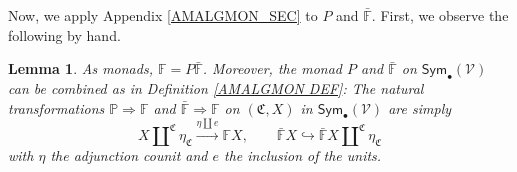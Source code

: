\documentclass[a4paper,10pt
,draft
]{article}%
\numberwithin{equation}{section}
\numberwithin{figure}{section}
\newtheorem{lemma}[equation]{Lemma}%
\theoremstyle{definition} %
\newcommand{\Sym}{\ensuremath{\mathsf{Sym}}}%
\newcommand{\V}{\ensuremath{\mathcal V}}
\newcommand{\1}{\ensuremath{\mathbbm 1}}%
\begin{document}
Now, we apply Appendix \ref{AMALGMON_SEC} to $P$ and $\bar{\mathbb F}$.
First, we observe the following by hand.
\begin{lemma}
      \label{PBARFCOMB_LEM}
      As monads, $\mathbb F = P \bar{\mathbb F}$.
      Moreover, the monad $P$ and $\bar{\mathbb F}$ on $\Sym_{\bullet}(\V)$ can be combined as in Definition \ref{AMALGMON DEF}:
      The natural transformations $\mathbb P \Rightarrow \mathbb F$ and $\bar{\mathbb F} \Rightarrow \mathbb F$
      on $(\mathfrak C, X)$ in $\Sym_\bullet(\V)$ are simply
      \[
            X \amalg^{\mathfrak C} \eta_{\mathfrak C} \xrightarrow{\eta \amalg e} \mathbb F X,
            \qquad
            \bar{\mathbb F} X \hookrightarrow \bar{\mathbb F} X \amalg^{\mathfrak C} \eta_{\mathfrak C}
      \]
      with $\eta$ the adjunction counit and $e$ the inclusion of the units.      
\end{lemma}
\end{document}
